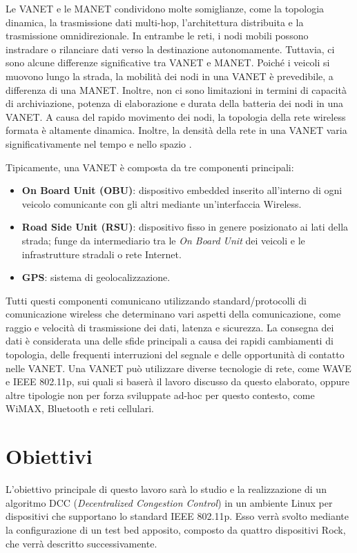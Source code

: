 Le VANET e le MANET condividono molte somiglianze, come la topologia dinamica, la trasmissione dati multi-hop, l'architettura distribuita e la trasmissione omnidirezionale. In entrambe le reti, i nodi mobili possono instradare o rilanciare dati verso la destinazione autonomamente. Tuttavia, ci sono alcune differenze significative tra VANET e MANET. Poiché i veicoli si muovono lungo la strada, la mobilità dei nodi in una VANET è prevedibile, a differenza di una MANET. Inoltre, non ci sono limitazioni in termini di capacità di archiviazione, potenza di elaborazione e durata della batteria dei nodi in una VANET. A causa del rapido movimento dei nodi, la topologia della rete wireless formata è altamente dinamica. Inoltre, la densità della rete in una VANET varia significativamente nel tempo e nello spazio \cite{anwer2014survey}.

Tipicamente, una VANET è composta da tre componenti principali: 
\begin{itemize}
    \item \textbf{On Board Unit (OBU)}: dispositivo embedded inserito all'interno di ogni veicolo comunicante con gli altri mediante un'interfaccia Wireless.
    \item \textbf{Road Side Unit (RSU)}: dispositivo fisso in genere posizionato ai lati della strada; funge da intermediario tra le \textit{On Board Unit} dei veicoli e le infrastrutture stradali o rete Internet.
    \item \textbf{GPS}: sistema di geolocalizzazione.
\end{itemize}

Tutti questi componenti comunicano utilizzando standard/protocolli di comunicazione wireless che determinano vari aspetti della comunicazione, come raggio e velocità di trasmissione dei dati, latenza e sicurezza. La consegna dei dati è considerata una delle sfide principali a causa dei rapidi cambiamenti di topologia, delle frequenti interruzioni del segnale e delle opportunità di contatto nelle VANET. Una VANET può utilizzare diverse tecnologie di rete, come WAVE e IEEE 802.11p, sui quali si baserà il lavoro discusso da questo elaborato, oppure altre tipologie non per forza sviluppate ad-hoc per questo contesto, come WiMAX, Bluetooth e reti cellulari.

\section{Obiettivi}
L'obiettivo principale di questo lavoro sarà lo studio e la realizzazione di un algoritmo DCC (\textit{Decentralized Congestion Control}) in un ambiente Linux per dispositivi che supportano lo standard IEEE 802.11p. Esso verrà svolto mediante la configurazione di un test bed apposito, composto da quattro dispositivi Rock, che verrà descritto successivamente.

